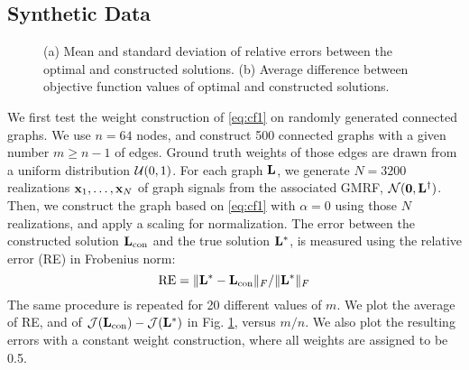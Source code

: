 \documentclass{article}
\begin{document}

%

\subsection{Synthetic Data}
\begin{figure}
\centering
{}%
\caption{(a) Mean and standard deviation of relative errors between the optimal and constructed solutions. (b) Average difference between objective function values of optimal and constructed solutions. }
\label{fig:error}
\vspace{-.3cm}
\end{figure}

We first test the weight construction of \eqref{eq:cf1} on randomly generated connected graphs. We use $n=64$ nodes, and construct 500 connected graphs with a given number $m\geq n-1$ of edges. Ground truth weights of those edges are drawn from a uniform distribution ${\cal U}(0,1)$. For each graph ${\bf L}$, we generate $N=3200$ realizations ${\bf x}_1,\dots,{\bf x}_N$ of graph signals from the associated GMRF, ${\cal N}({\bf 0},{\bf L}^\dagger)$. Then, we construct the graph based on \eqref{eq:cf1} with $\alpha=0$ using those $N$ realizations, and apply a scaling for normalization. The error between the constructed solution ${\bf L}_\text{con}$ and the true solution ${\bf L}^*$, is measured using the relative error (RE) in Frobenius norm: 
\[ \text{RE} = \| {\bf L}^* - {\bf L}_{\text{con}}\|_F/\| {\bf L}^* \|_F
\]
The same procedure is repeated for 20 different values of $m$. We plot the average of RE, and of ${\cal J}({\bf L}_\text{con})-{\cal J}({\bf L}^*)$ in Fig. \ref{fig:error}, versus $m/n$. We also plot the resulting errors with a constant weight construction, where all weights are assigned to be 0.5. 
\end{document}
